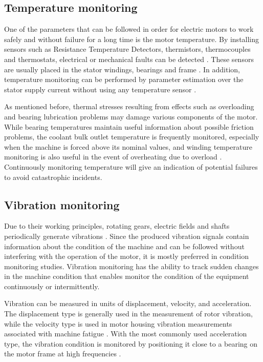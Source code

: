 \subsection{Temperature monitoring}

One of the parameters that can be followed in order for electric motors to work safely and without failure for a long time is the motor temperature. By installing sensors such as Resistance Temperature Detectors, thermistors, thermocouples and thermostats, electrical or mechanical faults can be detected \cite{mistry2016rotating}. These sensors are usually placed in the stator windings, bearings and frame \cite{ieee2017}. In addition, temperature monitoring can be performed by parameter estimation over the stator supply current without using any temperature sensor \cite{kumar2019comprehensive}.

As mentioned before, thermal stresses resulting from effects such as overloading and bearing lubrication problems may damage various components of the motor. While bearing temperatures maintain useful information about possible friction problems, the coolant bulk outlet temperature is frequently monitored, especially when the machine is forced above its nominal values, and winding temperature monitoring is also useful in the event of overheating due to overload \cite{thorsen1998methods}. Continuously monitoring temperature will give an indication of potential failures to avoid catastrophic incidents.

\subsection{Vibration monitoring}

Due to their working principles, rotating gears, electric fields and shafts periodically generate vibrations \cite{randall2021vibration}. Since the produced vibration signals contain information about the condition of the machine and can be followed without interfering with the operation of the motor, it is mostly preferred in condition monitoring studies. Vibration monitoring has the ability to track sudden changes in the machine condition that enables monitor the condition of the equipment continuously or intermittently.

Vibration can be measured in units of displacement, velocity, and acceleration. The displacement type is generally used in the measurement of rotor vibration, while the velocity type is used in motor housing vibration measurements associated with machine fatigue \cite{mistry2016rotating}. With the most commonly used acceleration type, the vibration condition is monitored by positioning it close to a bearing on the motor frame at high frequencies \cite{mistry2016rotating,iso}.


